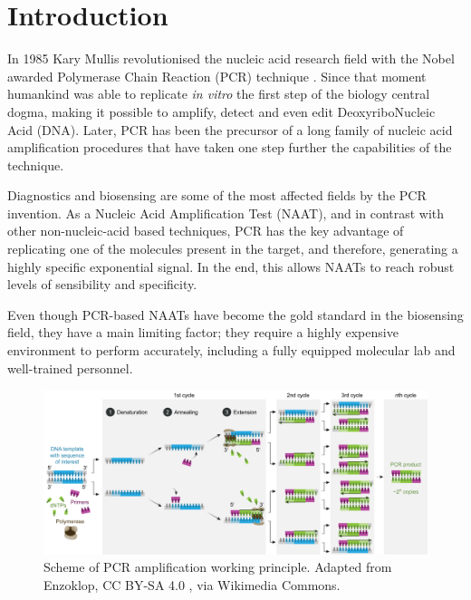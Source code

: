
\chapter{Introduction}

In 1985 Kary Mullis revolutionised the nucleic acid research field with the Nobel awarded Polymerase Chain Reaction (PCR) technique \cite{saiki_enzymatic_1985}. Since that moment humankind was able to replicate \emph{in vitro} the first step of the biology central dogma, making it possible to amplify, detect and even edit DeoxyriboNucleic Acid (DNA). Later, PCR has been the precursor of a long family of nucleic acid amplification procedures that have taken one step further the capabilities of the technique.

Diagnostics and biosensing are some of the most affected fields by the PCR invention. As a Nucleic Acid Amplification Test (NAAT), and in contrast with other non-nucleic-acid based techniques, PCR has the key advantage of replicating one of the molecules present in the target, and therefore, generating a highly specific exponential signal. In the end, this allows NAATs to reach robust levels of sensibility and specificity. 

Even though PCR-based NAATs have become the gold standard in the biosensing field\cite{oliveira_isothermal_2021}, they have a main limiting factor; they require a highly expensive environment to perform accurately, including a fully equipped molecular lab and well-trained personnel. 
\linebreak
\linebreak

\begin{figure}[b]
    \centering
    \includegraphics[width=1\textwidth]{figures/PCR.png}
    \caption[Scheme of PCR amplification working principle.] {Scheme of PCR amplification working principle. Adapted from Enzoklop, CC BY-SA 4.0 , via Wikimedia Commons.}
    \label{fig:PCR}
\end{figure}


